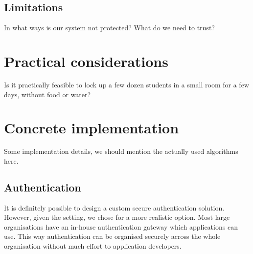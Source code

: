 \documentclass{article}
\begin{document}
\subsection{Limitations}
\label{subsec:req-limitations}

In what ways is our system not protected? What do we need to trust?

\section{Practical considerations}
\label{sec:practical}

Is it practically feasible to lock up a few dozen students in a small room for a
few days, without food or water?

\section{Concrete implementation}
\label{sec:implementation}

Some implementation details, we should mention the actually used algorithms
here.

\subsection{Authentication}
\label{subsec:impl-authentication}

It is definitely possible to design a custom secure authentication solution.
However, given the setting, we chose for a more realistic option. Most large
organisations have an in-house authentication gateway which applications can
use. This way authentication can be organised securely across the whole
organisation without much effort to application developers.
\end{document}
